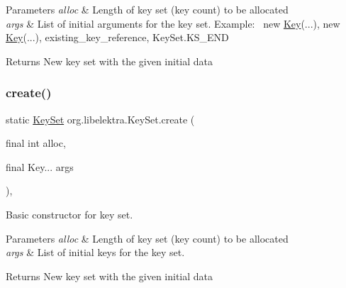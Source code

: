 \begin{DoxyParams}{Parameters}
{\em alloc} & Length of key set (key count) to be allocated \\
\hline
{\em args} & List of initial arguments for the key set. Example\+:~\newline
 new \hyperlink{classorg_1_1libelektra_1_1Key}{Key}(...), new \hyperlink{classorg_1_1libelektra_1_1Key}{Key}(...), existing\+\_\+key\+\_\+reference, Key\+Set.\+K\+S\+\_\+\+E\+ND \\
\hline
\end{DoxyParams}
\begin{DoxyReturn}{Returns}
New key set with the given initial data 
\end{DoxyReturn}
\mbox{\label{classorg_1_1libelektra_1_1KeySet_a441d0e45a150a6fd5f75be00ec42338d}} 
\subsubsection{\texorpdfstring{create()}{create()}\hspace{0.1cm}{\footnotesize\ttfamily [2/2]}}
{\footnotesize\ttfamily static \hyperlink{classorg_1_1libelektra_1_1KeySet}{Key\+Set} org.\+libelektra.\+Key\+Set.\+create (\begin{DoxyParamCaption}\item[{final int}]{alloc,  }\item[{final Key...}]{args }\end{DoxyParamCaption})\hspace{0.3cm}{\ttfamily [inline]}, {\ttfamily [static]}}



Basic constructor for key set. 


\begin{DoxyParams}{Parameters}
{\em alloc} & Length of key set (key count) to be allocated \\
\hline
{\em args} & List of initial keys for the key set. \\
\hline
\end{DoxyParams}
\begin{DoxyReturn}{Returns}
New key set with the given initial data 
\end{DoxyReturn}
\mbox{\label{classorg_1_1libelektra_1_1KeySet_a684ac5513b51d841cc04bdcdb203c4cf}} 
